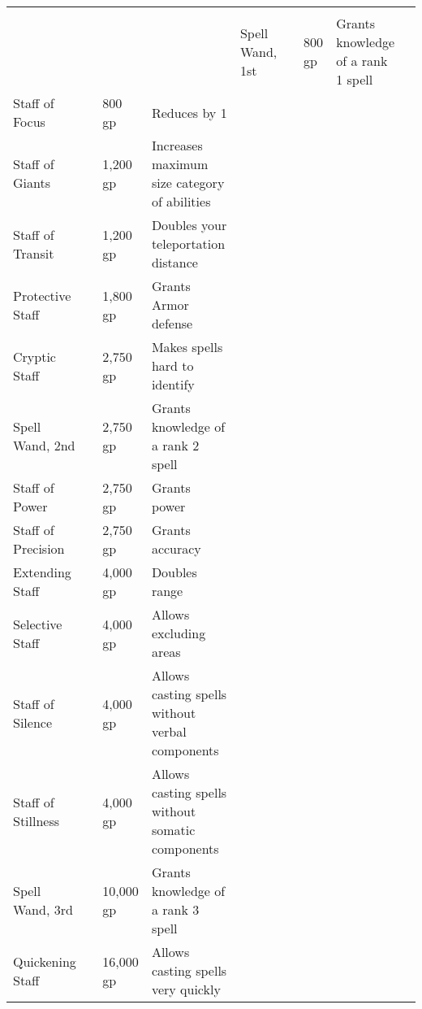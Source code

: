 
\begin{longtablewrapper}
\begin{longtable}{p{15em} p{3em} p{6em} p{25em} p{3em}}

 \\
 &  &  &  &  \tableheaderrule
Spell Wand, 1st &  & 800 gp & Grants knowledge of a rank 1 spell & \pageref{item:Spell Wand, 1st} \\
Staff of Focus &  & 800 gp & Reduces  by 1 & \pageref{item:Staff of Focus} \\
Staff of Giants &  & 1,200 gp & Increases maximum size category of abilities & \pageref{item:Staff of Giants} \\
Staff of Transit &  & 1,200 gp & Doubles your teleportation distance & \pageref{item:Staff of Transit} \\
Protective Staff &  & 1,800 gp & Grants  Armor defense & \pageref{item:Protective Staff} \\
Cryptic Staff &  & 2,750 gp & Makes spells hard to identify & \pageref{item:Cryptic Staff} \\
Spell Wand, 2nd &  & 2,750 gp & Grants knowledge of a rank 2 spell & \pageref{item:Spell Wand, 2nd} \\
Staff of Power &  & 2,750 gp & Grants   power & \pageref{item:Staff of Power} \\
Staff of Precision &  & 2,750 gp & Grants  accuracy & \pageref{item:Staff of Precision} \\
Extending Staff &  & 4,000 gp & Doubles range & \pageref{item:Extending Staff} \\
Selective Staff &  & 4,000 gp & Allows excluding areas & \pageref{item:Selective Staff} \\
Staff of Silence &  & 4,000 gp & Allows casting spells without verbal components & \pageref{item:Staff of Silence} \\
Staff of Stillness &  & 4,000 gp & Allows casting spells without somatic components & \pageref{item:Staff of Stillness} \\
Spell Wand, 3rd &  & 10,000 gp & Grants knowledge of a rank 3 spell & \pageref{item:Spell Wand, 3rd} \\
Quickening Staff &  & 16,000 gp & Allows casting spells very quickly & \pageref{item:Quickening Staff} \\

\end{longtable}
\end{longtablewrapper}
